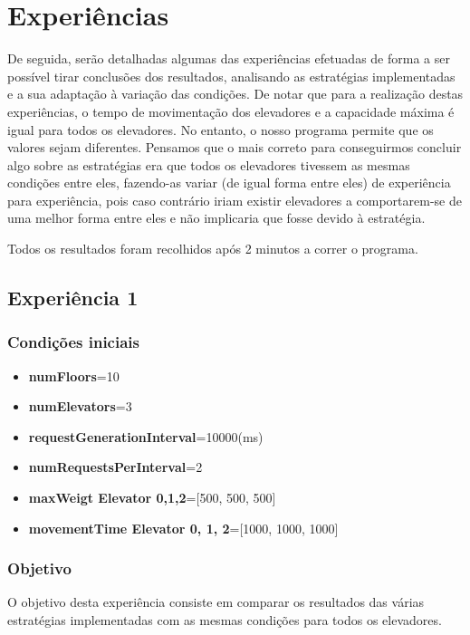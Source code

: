 ﻿\documentclass[a4paper]{article}
\begin{document}
\newpage

\section{Experiências}

De seguida, serão detalhadas algumas das experiências efetuadas de forma a ser possível tirar conclusões dos resultados, analisando as estratégias implementadas e a sua adaptação à variação das condições. De notar que para a realização destas experiências, o tempo de movimentação dos elevadores e a capacidade máxima é igual para todos os elevadores. No entanto, o nosso programa permite que os valores sejam diferentes. Pensamos que o mais correto para conseguirmos concluir algo sobre as estratégias era que todos os elevadores tivessem as mesmas condições entre eles, fazendo-as variar (de igual forma entre eles) de experiência para experiência, pois caso contrário iriam existir elevadores a comportarem-se de uma melhor forma entre eles e não implicaria que fosse devido à estratégia.

Todos os resultados foram recolhidos após 2 minutos a correr o programa.

\subsection{Experiência 1}

\subsubsection{Condições iniciais}

\begin{itemize}
\item \textbf{numFloors}=10
\item \textbf{numElevators}=3
\item \textbf{requestGenerationInterval}=10000(ms)
\item \textbf{numRequestsPerInterval}=2
\item \textbf{maxWeigt Elevator 0,1,2}=[500, 500, 500]
\item \textbf{movementTime Elevator 0, 1, 2}=[1000, 1000, 1000]
\end{itemize}

\subsubsection{Objetivo} 

O objetivo desta experiência consiste em comparar os resultados das várias estratégias implementadas com as mesmas condições para todos os elevadores.
\end{document}
